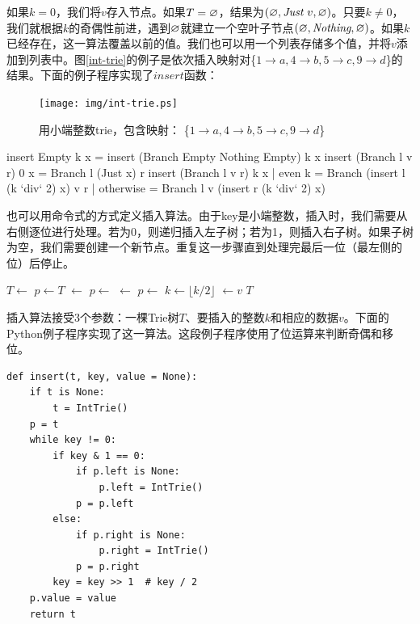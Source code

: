 \documentclass[b5paper]{ctexart}
\begin{document}
如果$k = 0$，我们将$v$存入节点。如果$T = \varnothing$，结果为$(\varnothing, \textit{Just}\ v, \varnothing)$。只要$k \neq 0$，我们就根据$k$的奇偶性前进，遇到$\varnothing$就建立一个空叶子节点$(\varnothing, \textit{Nothing}, \varnothing)$。如果$k$已经存在，这一算法覆盖以前的值。我们也可以用一个列表存储多个值，并将$v$添加到列表中。图\ref{int-trie}的例子是依次插入映射对\{$ 1 \rightarrow a, 4 \rightarrow b, 5 \rightarrow c, 9 \rightarrow d$\}的结果。下面的例子程序实现了$insert$函数：

\begin{figure}[htbp]
  \centering
  \texttt{[image: img/int-trie.ps]}
  \caption{用小端整数trie，包含映射：
          \{$ 1 \rightarrow a, 4 \rightarrow b, 5 \rightarrow c, 9 \rightarrow d$\}}
  \label{fig:int-trie}
\end{figure}

\begin{Haskell}
insert Empty k x = insert (Branch Empty Nothing Empty) k x
insert (Branch l v r) 0 x = Branch l (Just x) r
insert (Branch l v r) k x | even k    = Branch (insert l (k `div` 2) x) v r
                          | otherwise = Branch l v (insert r (k `div` 2) x)
\end{Haskell}

也可以用命令式的方式定义插入算法。由于key是小端整数，插入时，我们需要从右侧逐位进行处理。若为0，则递归插入左子树；若为1，则插入右子树。如果子树为空，我们需要创建一个新节点。重复这一步骤直到处理完最后一位（最左侧的位）后停止。

\begin{algorithmic}[1]
    \State $T \gets$ 
  \EndIf
  \State $p \gets T$
        \State {} $\gets$ 
      \EndIf
      \State $p \gets$ 
    \Else
        \State {} $\gets$ 
      \EndIf
      \State $p \gets$ 
    \EndIf
    \State $k \gets \lfloor k/2 \rfloor$
  \EndWhile
  \State {} $\gets v$
  \State \Return $T$
\EndFunction
\end{algorithmic}

插入算法接受3个参数：一棵Trie树$T$、要插入的整数$k$和相应的数据$v$。下面的Python例子程序实现了这一算法。这段例子程序使用了位运算来判断奇偶和移位。

\lstset{language=Python}
\begin{lstlisting}
def insert(t, key, value = None):
    if t is None:
        t = IntTrie()
    p = t
    while key != 0:
        if key & 1 == 0:
            if p.left is None:
                p.left = IntTrie()
            p = p.left
        else:
            if p.right is None:
                p.right = IntTrie()
            p = p.right
        key = key >> 1  # key / 2
    p.value = value
    return t
\end{lstlisting}
\end{document}
